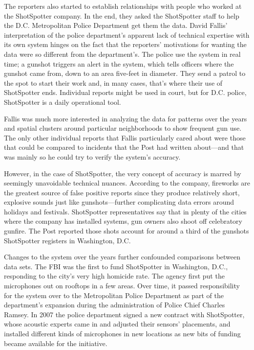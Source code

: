 The reporters also started to establish relationships with people who worked
at the ShotSpotter company. In the end, they asked the ShotSpotter staff to
help the D.C. Metropolitan Police Department get them the data.
David Fallis' interpretation of the police department's apparent lack of technical
expertise with its own system hinges on the fact that the reporters'
motivations for wanting the data were so different from the department's.
The police use the system in real time; a gunshot triggers an alert in the
system, which tells officers where the gunshot came from, down to an area
five-feet in diameter. They send a patrol to the spot to start their work and,
in many cases, that's where their use of ShotSpotter ends. Individual reports
might be used in court, but for D.C. police, ShotSpotter is a daily operational
tool.

Fallis was much more interested in analyzing the data for patterns over
the years and spatial clusters around particular neighborhoods to show
frequent gun use. The only other individual reports that Fallis particularly
cared about were those that could be compared to incidents that the Post
had written about—and that was mainly so he could try to verify the system's
accuracy.

However, in the case of ShotSpotter, the very concept of accuracy is
marred by seemingly unavoidable technical nuances. According to the
company, fireworks are the greatest source of false positive reports since
they produce relatively short, explosive sounds just like gunshots—further
complicating data errors around holidays and festivals. ShotSpotter representatives
say that in plenty of the cities where the company has installed
systems, gun owners also shoot off celebratory gunfire. The Post reported
those shots account for around a third of the gunshots ShotSpotter registers
in Washington, D.C.

Changes to the system over the years further confounded comparisons
between data sets. The FBI was the first to fund ShotSpotter in Washington,
D.C., responding to the city's very high homicide rate. The agency first
put the microphones out on rooftops in a few areas. Over time, it passed
responsibility for the system over to the Metropolitan Police Department
as part of the department's expansion during the administration of Police
Chief Charles Ramsey. In 2007 the police department signed a new contract
with ShotSpotter, whose acoustic experts came in and adjusted their sensors'
placements, and installed different kinds of microphones in new locations
as new bits of funding became available for the initiative.

